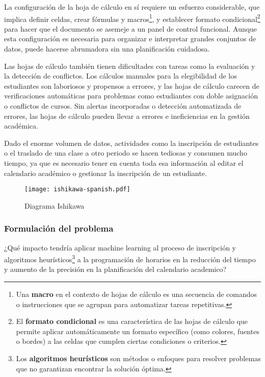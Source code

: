 La configuración de la hoja de cálculo en sí requiere un esfuerzo considerable, que implica definir celdas, crear fórmulas y macros\footnote{Una \textbf{macro} en el contexto de hojas de cálculo es una secuencia de comandos o instrucciones que se agrupan para automatizar tareas repetitivas.}, y establecer formato condicional\footnote{El \textbf{formato condicional} es una característica de las hojas de cálculo que permite aplicar automáticamente un formato específico (como colores, fuentes o bordes) a las celdas que cumplen ciertas condiciones o criterios.} para hacer que el documento se asemeje a un panel de control funcional.
Aunque esta configuración es necesaria para organizar e interpretar grandes conjuntos de datos, puede hacerse abrumadora sin una planificación cuidadosa.

Las hojas de cálculo también tienen dificultades con tareas como la evaluación y la detección de conflictos.
Los cálculos manuales para la elegibilidad de los estudiantes son laboriosos y propensos a errores, y las hojas de cálculo carecen de verificaciones automáticas para problemas como estudiantes con doble asignación o conflictos de cursos.
Sin alertas incorporadas o detección automatizada de errores, las hojas de cálculo pueden llevar a errores e ineficiencias en la gestión académica.

Dado el enorme volumen de datos, actividades como la inscripción de estudiantes o el traslado de una clase a otro periodo se hacen tediosas y consumen mucho tiempo, ya que es necesario tener en cuenta toda esa información al editar el calendario académico o gestionar la inscripción de un estudiante.

\begin{figure}[H]
    \centering
    \caption{Diagrama Ishikawa} \label{fig:ishikawa}
    \texttt{[image: ishikawa-spanish.pdf]}
\end{figure}

\subsubsection{Formulación del problema}
¿Qué impacto tendría aplicar machine learning al proceso de inscripción y algoritmos heurísticos\footnote{Los \textbf{algoritmos heurísticos} son métodos o enfoques para resolver problemas que no garantizan encontrar la solución óptima.} a la programación de horarios en la reducción del tiempo y aumento de la precisión en la planificación del calendario academico?
